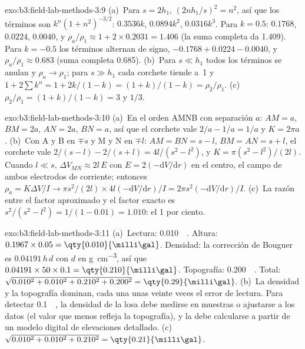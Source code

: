 \begin{solution}{exo:b3:field-lab-methods-3:9}
(a)~Para $s = 2h_1$, $(2nh_1/s)^2 = n^2$, así que los términos son $k^n(1 +
n^2)^{-3/2}$: $0.3536k$, $0.0894k^2$, $0.0316k^3$. Para $k = 0.5$:
$\num{0.1768}$, $\num{0.0224}$, $\num{0.0040}$, y $\rho_a/\rho_1 \approx
1 + 2\times0.2031 = \num{1.406}$ (la suma completa da \num{1.409}). Para $k
= -0.5$ los términos alternan de signo, $-0.1768 + 0.0224 - 0.0040$, y
$\rho_a/\rho_1 \approx \num{0.683}$ (suma completa \num{0.685}). (b)~Para $s \ll
h_1$ todos los términos se anulan y $\rho_a \to \rho_1$; para $s \gg h_1$ cada
corchete tiende a~1 y $1 + 2\sum k^n = 1 + 2k/(1 - k) = (1 + k)/(1 -
k) = \rho_2/\rho_1$. (c)~$\rho_2/\rho_1 = (1 + k)/(1 - k) = 3$ y $1/3$.
\end{solution}

\begin{solution}{exo:b3:field-lab-methods-3:10}
(a)~En el orden AMNB con separación $a$: $AM = a$, $BM = 2a$, $AN = 2a$,
$BN = a$, así que el corchete vale $2/a - 1/a = 1/a$ y $K = 2\pi a$.
(b)~Con A y B en $\mp s$ y M y N en $\mp l$: $AM = BN = s - l$,
$BM = AN = s + l$, el corchete vale $2/(s - l) - 2/(s + l) = 4l/(s^2 -
l^2)$, y $K = \pi(s^2 - l^2)/(2l)$. Cuando $l \ll s$, $\Delta V_{MN}
\approx 2l\,E$ con $E = 2(-\mathrm{d}V/\mathrm{d}r)$ en el centro, el
campo de ambos electrodos de corriente; entonces $\rho_a = K\Delta V/I \to
\pi s^2/(2l)\times 4l(-\mathrm{d}V/\mathrm{d}r)/I = 2\pi s^2(-
\mathrm{d}V/\mathrm{d}r)/I$. (c)~La razón entre el factor aproximado y el
factor exacto es $s^2/(s^2 - l^2) = 1/(1 - 0.01) = 1.010$: el 1 por ciento.
\end{solution}

\begin{solution}{exo:b3:field-lab-methods-3:11}
(a)~Lectura: \qty{0.010}{\milli\gal}. Altura:
$0.1967\times0.05 = \qty{0.010}{\milli\gal}$. Densidad: la corrección de Bouguer
es $0.04191\,h\,d$ con $d$ en \unit{g.cm^{-3}}, así que
$0.04191\times50\times0.1 = \qty{0.210}{\milli\gal}$. Topografía:
\qty{0.200}{\milli\gal}. Total: $\sqrt{0.010^2 + 0.010^2 + 0.210^2 +
0.200^2} = \qty{0.29}{\milli\gal}$. (b)~La densidad y la topografía
dominan, cada una unas veinte veces el error de lectura. Para detectar
\qty{0.1}{\milli\gal}, la densidad de la losa debe medirse en
muestras o ajustarse a los datos (el valor que menos refleja la
topografía), y la  debe calcularse a partir de un modelo digital de elevaciones detallado.
(c)~$\sqrt{0.010^2 + 0.010^2 + 0.210^2} = \qty{0.21}{\milli\gal}$.
\end{solution}

